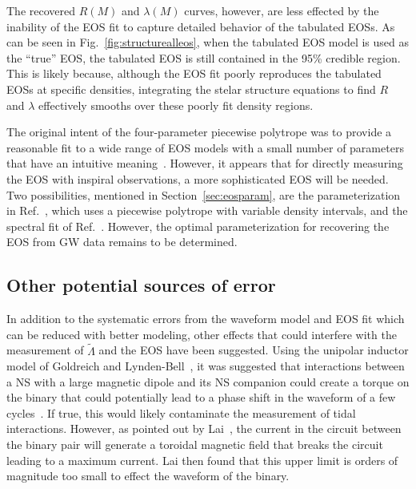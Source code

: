 \documentclass[twocolumn,prd,amssymb,aps,nofootinbib,showpacs,epsf]{revtex4}
\begin{document}
The recovered $R(M)$ and $\lambda(M)$ curves, however, are less effected by the inability of the EOS fit to capture detailed behavior of the tabulated EOSs. As can be seen in Fig.~\ref{fig:structurealleos}, when the tabulated EOS model is used as the ``true'' EOS, the tabulated EOS is still contained in the 95\% credible region. This is likely because, although the EOS fit poorly reproduces the tabulated EOSs at specific densities, integrating the stelar structure equations to find $R$ and $\lambda$ effectively smooths over these poorly fit density regions.

The original intent of the four-parameter piecewise polytrope was to provide a reasonable fit to a wide range of EOS models with a small number of parameters that have an intuitive meaning~\cite{ReadLackey2009}. However, it appears that for directly measuring the EOS with inspiral observations, a more sophisticated EOS will be needed. Two possibilities, mentioned in Section~\ref{sec:eosparam}, are the parameterization in Ref.~\cite{SteinerLattimerBrown2010}, which uses a piecewise polytrope with variable density intervals, and the spectral fit of Ref.~\cite{Lindblom2010}. However, the optimal parameterization for recovering the EOS from GW data remains to be determined.

\subsection{Other potential sources of error}

In addition to the systematic errors from the waveform model and EOS fit which can be reduced with better modeling, other effects that could interfere with the measurement of $\tilde\Lambda$ and the EOS have been suggested. Using the unipolar inductor model of Goldreich and Lynden-Bell~\cite{GoldreichLyndenBell1969}, it was suggested that interactions between a NS with a large magnetic dipole and its NS companion could create a torque on the binary that could potentially lead to a phase shift in the waveform of a few cycles~\cite{Piro2012}. If true, this would likely contaminate the measurement of tidal interactions. However, as pointed out by Lai~\cite{Lai2012}, the current in the circuit between the binary pair will generate a toroidal magnetic field that breaks the circuit leading to a maximum current. Lai then found that this upper limit is orders of magnitude too small to effect the waveform of the binary.
\end{document}
